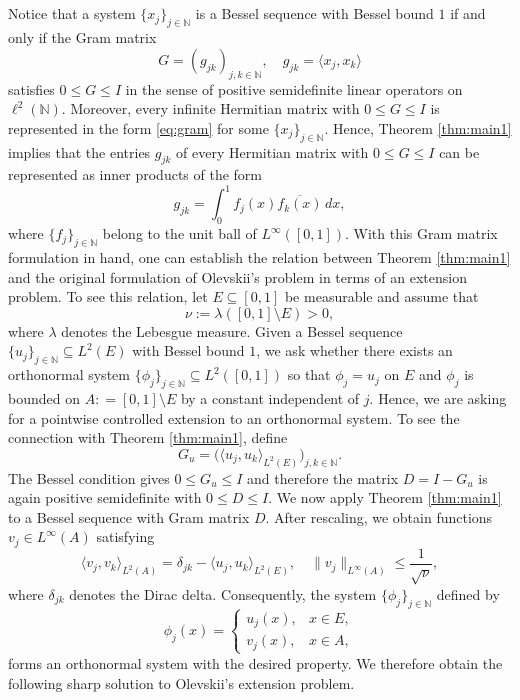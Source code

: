 \documentclass[reqno,a4paper,12pt]{amsart}
\numberwithin{equation}{section}
\def\N{{\mathbb N}}
\newcommand\1{\mathds{1}}
\begin{document}
\subsection{}\label{Olevskii extension}
Notice that a system $\{ x_j \}_{j\in \N}$ is a Bessel sequence with Bessel bound $1$ if and only if the Gram matrix
\begin{equation}\label{eq:gram}
    G=(g_{jk})_{j,k\in\N}, \quad g_{jk}=\langle x_j,x_k\rangle
\end{equation}
satisfies $0 \leq G \leq I$ in the sense of positive semidefinite linear operators on $\ell^2(\N)$. Moreover, every infinite Hermitian matrix with $0 \leq G \leq I$ is represented in the form \eqref{eq:gram} for some $\{ x_j \}_{j\in \N}$.
Hence, Theorem \ref{thm:main1} implies that the entries $g_{jk}$ of every Hermitian matrix with $0 \leq G \leq I$ can be represented as inner products of the form
$$
g_{jk} = \int_0^1 f_j(x) \overline{f_k(x)} \, dx,
$$
where $\{ f_j \}_{j \in \N}$ belong to the unit ball of $L^\infty([0,1])$.
With this Gram matrix formulation in hand, one can establish the relation between Theorem \ref{thm:main1} and the original formulation of Olevskii's problem in terms of an extension problem. To see this relation, let $E \subseteq [0,1]$ be measurable and assume that
$$
\nu := \lambda([0,1]\setminus E)>0,
$$
where $\lambda$ denotes the Lebesgue measure. Given a Bessel sequence $\{ u_j \}_{j\in \N} \subseteq L^2(E)$ with Bessel bound $1$, we ask whether there exists an orthonormal system $\{ \phi_j \}_{j\in \N} \subseteq L^2([0,1])$ so that $\phi_j = u_j$ on $E$ and $\phi_j$ is bounded on $A : = [0,1] \setminus E$ by a constant independent of $j$. Hence, we are asking for a pointwise controlled extension to an orthonormal system. To see the connection with Theorem \ref{thm:main1}, define
$$
G_u=
\bigl(\langle u_j,u_k\rangle_{L^2(E)}\bigr)_{j,k\in \N}.
$$
The Bessel condition gives
$
0\le G_u\le I
$
and therefore the matrix
$
D=I-G_u
$
is again positive semidefinite with $0 \leq D \leq I$. We now apply
Theorem \ref{thm:main1} to a Bessel sequence with Gram matrix $D$. After rescaling, we obtain functions
$v_j\in L^\infty(A)$ satisfying
$$
\langle v_j,v_k\rangle_{L^2(A)}
=
\delta_{jk}
-
\langle u_j,u_k\rangle_{L^2(E)}, \quad \|v_j\|_{L^\infty(A)}
\leq \frac{1}{\sqrt{\nu}},
$$
where $\delta_{jk}$ denotes the Dirac delta. Consequently, the system $\{ \phi_j\}_{j \in \N}$ defined by
$$
\phi_j(x)
=
\begin{cases}
u_j(x), & x \in E,\\
v_j(x), & x \in A,
\end{cases}
$$
forms an orthonormal system with the desired property. We therefore obtain the following sharp solution to Olevskii's extension problem.
\end{document}

